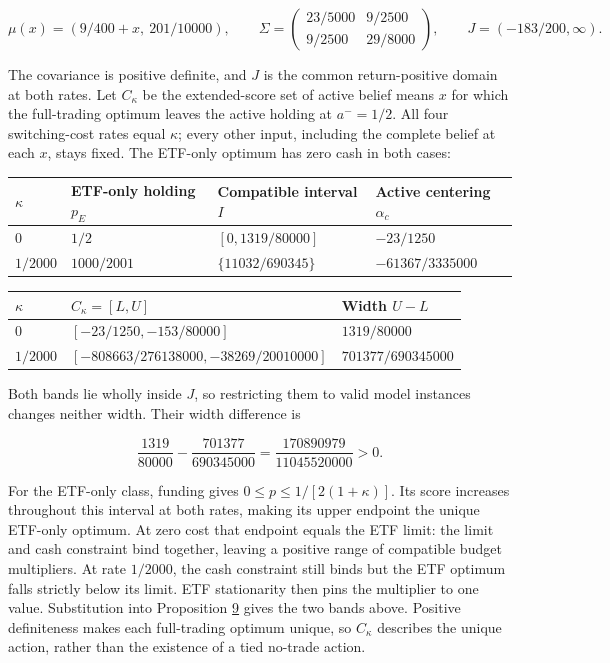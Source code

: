 \documentclass[11pt]{article}
\begin{document}
\begin{equation*}
\mu(x)=(9/400+x,\ 201/10000),\qquad
\Sigma=
\begin{pmatrix}
23/5000&9/2500\\
9/2500&29/8000
\end{pmatrix},
\qquad J=(-183/200,\infty).
\tag{24}\label{eq:24}
\end{equation*}

The covariance is positive definite, and \(J\) is the common
return-positive domain at both rates. Let \(C_\kappa\) be the
extended-score set of active belief means \(x\) for which the
full-trading optimum leaves the active holding at \(a^-=1/2\).
All four switching-cost rates equal \(\kappa\); every other input,
including the complete belief at each \(x\), stays fixed. The
ETF-only optimum has zero cash in both cases:

{\small
\begin{longtable}{llll}
\toprule
\textbf{\(\kappa\)} & \textbf{ETF-only holding \(p_E\)} & \textbf{Compatible interval \(I\)} & \textbf{Active centering \(\alpha_c\)} \\
\midrule
\endhead
\bottomrule
\endlastfoot
\(0\) & \(1/2\) & \([0,1319/80000]\) & \(-23/1250\) \\
\(1/2000\) & \(1000/2001\) & \(\{11032/690345\}\) & \(-61367/3335000\) \\
\end{longtable}}

{
\begin{longtable}{lll}
\toprule
\textbf{\(\kappa\)} & \textbf{\(C_\kappa=[L,U]\)} & \textbf{Width \(U-L\)} \\
\midrule
\endhead
\bottomrule
\endlastfoot
\(0\) & \([-23/1250,-153/80000]\) & \(1319/80000\) \\
\(1/2000\) & \([-808663/276138000,-38269/20010000]\) & \(701377/690345000\) \\
\end{longtable}}

Both bands lie wholly inside \(J\), so restricting them to valid
model instances changes neither width. Their width difference is

\begin{equation*}
\frac{1319}{80000}-\frac{701377}{690345000}
=\frac{170890979}{11045520000}>0.
\tag{25}\label{eq:25}
\end{equation*}

For the ETF-only class, funding gives
\(0\leq p\leq1/[2(1+\kappa)]\). Its score increases throughout
this interval at both rates, making its upper endpoint the unique
ETF-only optimum. At zero cost that endpoint equals the ETF limit:
the limit and cash constraint bind together, leaving a positive
range of compatible budget multipliers. At rate \(1/2000\), the
cash constraint still binds but the ETF optimum falls strictly
below its limit. ETF stationarity then pins the multiplier to one
value. Substitution into Proposition \hyperref[res:Proposition-9]{9} gives the two bands above.
Positive definiteness makes each full-trading optimum unique, so
\(C_\kappa\) describes the unique action, rather than the existence
of a tied no-trade action.
\end{document}
